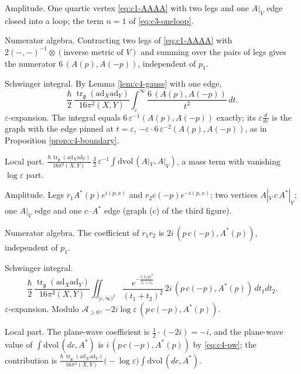 \begin{example}
\label{ex:c4-seagull}
Amplitude. One quartic vertex \eqref{eq:c1-AAAA} with two legs and one $A|_V$ edge closed into a loop; the term $n=1$ of \eqref{eq:c3-oneloop}.

Numerator algebra. Contracting two legs of \eqref{eq:c1-AAAA} with $2(-,-)^{-1}\otimes(\text{inverse metric of }V)$ and summing over the pairs of legs gives the numerator $6\,(A(p),A(-p))$, independent of $p_1$.

Schwinger integral. By Lemma \ref{lem:c4-gauss} with one edge,
\[
\frac\hbar2\,\frac{\operatorname{tr}_{\mathfrak g}(\mathrm{ad}_X\mathrm{ad}_Y)}{16\pi^2(X,Y)}\int_\varepsilon^\infty\frac{6\,(A(p),A(-p))}{t^2}\,dt .
\]
$\varepsilon$-expansion. The integral equals $6\,\varepsilon^{-1}(A(p),A(-p))$ exactly; its $\varepsilon\frac{d}{d\varepsilon}$ is the graph with the edge pinned at $t=\varepsilon$, $-\varepsilon\cdot6\,\varepsilon^{-2}(A(p),A(-p))$, as in Proposition \ref{prop:c4-boundary}.

Local part. $\frac{\hbar\,\operatorname{tr}_{\mathfrak g}(\mathrm{ad}_X\mathrm{ad}_Y)}{16\pi^2(X,Y)}\,\tfrac32\,\varepsilon^{-1}\int\mathrm{dvol}\,(A|_V,A|_V)$, a mass term with vanishing $\log\varepsilon$ part.
\end{example}

\begin{example}
\label{ex:c4-cAstar}
Amplitude. Legs $r_1A^*(p)e^{i(p,x)}$ and $r_2c(-p)e^{-i(p,x)}$; two vertices $A|_V\,c\,A^*|_V$; one $A|_V$ edge and one $c$--$A^*$ edge (graph (c) of the third figure).

Numerator algebra. The coefficient of $r_1r_2$ is $2i\,(p\,c(-p),A^*(p))$, independent of $p_1$.

Schwinger integral.
\[
\frac\hbar2\,\frac{\operatorname{tr}_{\mathfrak g}(\mathrm{ad}_X\mathrm{ad}_Y)}{16\pi^2(X,Y)}\iint_{[\varepsilon,\infty)^2}\frac{e^{-\frac{t_1t_2|p|^2}{t_1+t_2}}}{(t_1+t_2)^2}\,2i\,(p\,c(-p),A^*(p))\,dt_1dt_2 .
\]
$\varepsilon$-expansion. Modulo $\mathscr A_{\ge0}$, $-2i\log\varepsilon\,(p\,c(-p),A^*(p))$.

Local part. The plane-wave coefficient is $\tfrac12\cdot(-2i)=-i$, and the plane-wave value of $\int\mathrm{dvol}\,(dc,A^*)$ is $i\,(p\,c(-p),A^*(p))$ by \eqref{eq:c4-pw}; the contribution is $\frac{\hbar\,\operatorname{tr}_{\mathfrak g}(\mathrm{ad}_X\mathrm{ad}_Y)}{16\pi^2(X,Y)}\big(-\log\varepsilon\big)\int\mathrm{dvol}\,(dc,A^*)$.
\end{example}

